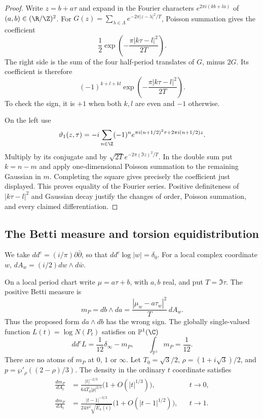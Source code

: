 \begin{proof}
Write $z=b+a\tau$ and expand in the Fourier characters
$e^{2\pi i(kb+la)}$ of $(a,b)\in(\R/\Z)^2$.
For $G(z)=\sum_{\lambda\in\Lambda}e^{-2\pi|z-\lambda|^2/T}$,
Poisson summation gives the coefficient
\[
 \frac12\exp\left(-\frac{\pi|k\tau-l|^2}{2T}\right).
\]
The right side is the sum of the four half-period translates
of $G$, minus $2G$. Its coefficient is therefore
\[
 (-1)^{k+l+kl}
       \exp\left(-\frac{\pi|k\tau-l|^2}{2T}\right).
\]
To check the sign, it is $+1$ when both $k,l$ are even and
$-1$ otherwise.

On the left use
\[
 \vartheta_1(z,\tau)
 =-i\sum_{n\in\Z}(-1)^n
        e^{\pi i(n+1/2)^2\tau+2\pi i(n+1/2)z}.
\]
Multiply by its conjugate and by
$\sqrt{2T}e^{-2\pi(\Im z)^2/T}$.
In the double sum put $k=n-m$ and apply one-dimensional
Poisson summation to the remaining Gaussian in $m$.
Completing the square gives precisely the coefficient just
displayed. This proves equality of the Fourier series.
Positive definiteness of $|k\tau-l|^2$ and Gaussian decay
justify the changes of order, Poisson summation, and every
claimed differentiation.
\end{proof}




\subsection{The Betti measure and torsion equidistribution}

We take $dd^c=(i/\pi)\partial\bar\partial$, so that
$dd^c\log|w|=\delta_0$. For a local complex coordinate $w$,
$dA_w=(i/2)dw\wedge d\bar w$.

\begin{proposition}\label{ari:C.8.9}
On a local period chart write $\mu=a\tau+b$, with $a,b$ real,
and put $T=\Im\tau$. The positive Betti measure is
\[
 m_P=db\wedge da
 =\frac{|\mu_w-a\tau_w|^2}{T}\,dA_w.
\]
Thus the proposed form $da\wedge db$ has the wrong sign.
The globally single-valued function $L(t)=\log N(P_t)$ satisfies
on $\mathbb P^1(\C)$
\begin{equation}\label{ari:eq:ca-current}
 dd^cL=\frac1{12}\delta_\infty-m_P,\qquad
               \int_{\mathbb P^1}m_P=\frac1{12}.
\end{equation}
There are no atoms of $m_P$ at $0$, $1$ or $\infty$.
Let $T_0=\sqrt3/2$, $\rho=(1+i\sqrt3)/2$, and
$p=\wp'_\rho((2-\rho)/3)$. The density in the ordinary
$t$ coordinate satisfies
\begin{align}
 \frac{dm_P}{dA_t}
 &=\frac{|t|^{-2/3}}{64T_0|p|^{2/3}}
                      \bigl(1+O(|t|^{1/3})\bigr),
                         &&t\longrightarrow0,\label{ari:eq:ca-density0}\\
 \frac{dm_P}{dA_t}
 &=\frac{|t-1|^{-3/2}}{24\pi^2\sqrt{E_4(i)}}
                      \bigl(1+O(|t-1|^{1/2})\bigr),
                         &&t\longrightarrow1.\label{ari:eq:ca-density1}
\end{align}
\end{proposition}

